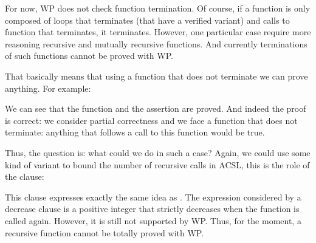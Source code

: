 For now, WP does not check function termination. Of course, if a function is
only composed of loops that terminates (that have a verified variant) and
calls to function that terminates, it terminates. However, one particular
case require more reasoning recursive and mutually recursive functions. And
currently terminations of such functions cannot be proved with WP.



That basically means that using a function that does not terminate we can
prove anything. For example:







We can see that the function and the assertion are proved. And indeed the
proof is correct: we consider partial correctness and we face a function
that does not terminate: anything that follows a call to this function would
be true.



Thus, the question is: what could we do in such a case? Again, we could use
some kind of variant to bound the number of recursive calls in ACSL, this is
the role of the  clause:




This clause expresses exactly the same idea as . The
expression considered by a decrease clause is a positive integer that
strictly decreases when the function is called again. However, it is still
not supported by WP. Thus, for the moment, a recursive function cannot be
totally proved with WP.
